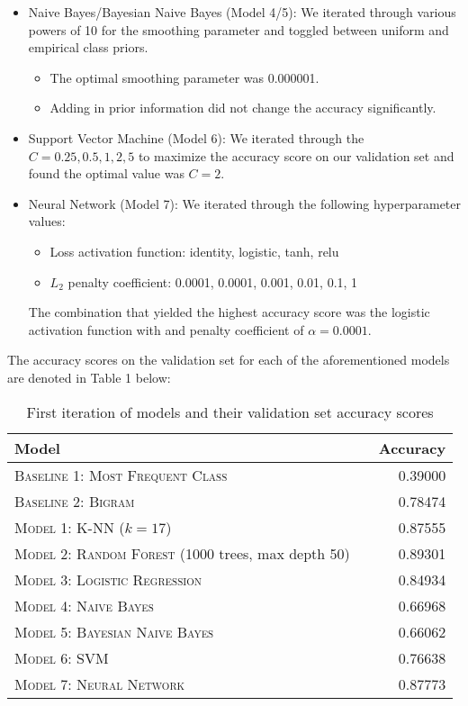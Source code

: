 \documentclass[11pt]{article}
\begin{document}
\begin{itemize}
      \item Naive Bayes/Bayesian Naive Bayes (Model 4/5): We iterated through various powers of 10 for the smoothing parameter and toggled between uniform and empirical class priors.
      \begin{itemize}
          \item The optimal smoothing parameter was 0.000001.
          \item Adding in prior information did not change the accuracy significantly.
      \end{itemize}
      
      \item Support Vector Machine (Model 6): We iterated through the $C=0.25, 0.5, 1, 2, 5$ to maximize the accuracy score on our validation set and found the optimal value was $C=2$.
      
      \item Neural Network (Model 7): We iterated through the following hyperparameter values:
      \begin{itemize}
          \item Loss activation function: identity, logistic, tanh, relu
          \item $L_2$ penalty coefficient: 0.0001, 0.0001, 0.001, 0.01, 0.1, 1
      \end{itemize}
      The combination that yielded the highest accuracy score was the logistic activation function with and penalty coefficient of $\alpha=0.0001$.
      
  \end{itemize}
  
  The accuracy scores on the validation set for each of the aforementioned models are denoted in Table 1 below:
    \begin{table}[h!]
        \centering
        \begin{tabular}{llr}
         \toprule
         Model &  & Accuracy \\
         \midrule
         \textsc{Baseline 1: Most Frequent Class} & & 0.39000 \\
         \textsc{Baseline 2: Bigram} & & 0.78474 \\
         \textsc{Model 1: K-NN} ($k=17$) & & 0.87555 \\
         \textsc{Model 2: Random Forest} (1000 trees, max depth 50) & & 0.89301 \\
         \textsc{Model 3: Logistic Regression} & & 0.84934 \\
         \textsc{Model 4: Naive Bayes} & &  0.66968\\
         \textsc{Model 5: Bayesian Naive Bayes} & &  0.66062\\
         \textsc{Model 6: SVM} & & 0.76638 \\
         \textsc{Model 7: Neural Network} & & 0.87773 \\
         \bottomrule
        \end{tabular}
        \caption{\label{tab:results} First iteration of models and their validation set accuracy scores}
    \end{table}
\end{document}
